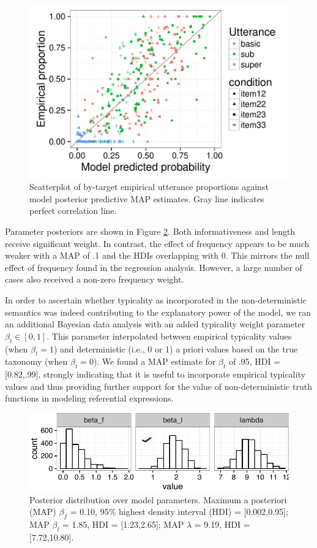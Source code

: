 \documentclass[11pt]{article}
\newcommand{\figref}[1]{Figure \ref{#1}}
\begin{document}
\begin{figure}
\centering
\includegraphics[width=.7\textwidth]{../../../models/5d_bda_nom_full/graphs/scatterplot-fulldataset-typicalities-hmc}
\caption{Scatterplot of by-target empirical utterance proportions against model posterior predictive MAP estimates. Gray line indicates perfect correlation line.}
\label{fig:exp2scatter}
\end{figure}

Parameter posteriors are shown in \figref{fig:nominalparamposteriors}. Both informativeness and length receive significant weight. In contrast, the effect of frequency appears to be much weaker with a MAP of .1 and the HDIs overlapping with 0. This mirrors the null effect of frequency found in the regression analysis. However, a large number of cases also received a non-zero frequency weight.

In order to ascertain whether typicality as incorporated in the non-deterministic semantics was indeed contributing to the explanatory power of the model, we ran an additional Bayesian data analysis with an added typicality weight parameter $\beta_t \in [0, 1]$. This parameter interpolated between empirical typicality values (when $\beta_t = 1$) and deterministic (i.e., 0 or 1) a priori values based on the true taxonomy (when $\beta_t = 0$). We found a MAP estimate for $\beta_t$ of .95, HDI = [0.82,.99], strongly indicating that it is useful to incorporate empirical typicality values and thus providing further support for the value of non-deterministic truth functions in modeling referential expressions.

\begin{figure}
\centering
\includegraphics[width=.9\textwidth]{../../../models/5d_bda_nom_full/graphs/parameterposteriors-fulldataset-typicalities-hmc}
\caption{Posterior distribution over model parameters. Maximum a posteriori (MAP)  $\beta_f$ = 0.10, 95\% highest density interval (HDI) = [0.002,0.95]; MAP $\beta_l$ = 1.85, HDI = [1.23,2.65]; MAP $\lambda$ = 9.19, HDI = [7.72,10.80].}
\label{fig:nominalparamposteriors}
\end{figure}
\end{document}
